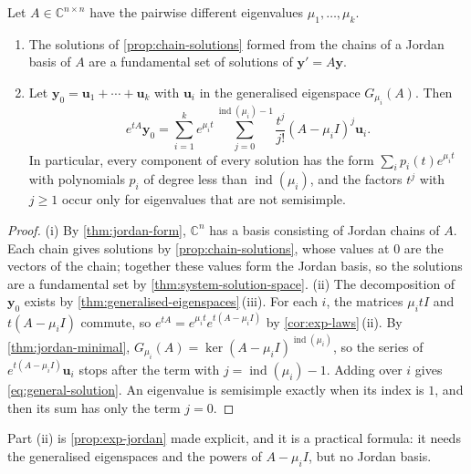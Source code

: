 \begin{theorem}
\label{thm:general-solution-systems}
Let $A\in\mathbb C^{n\times n}$ have the pairwise different eigenvalues $\mu_1,\ldots,\mu_k$.
\begin{enumerate}
\item The solutions of \cref{prop:chain-solutions} formed from the chains of a Jordan basis of $A$ are a fundamental set of solutions of $\mathbf y'=A\mathbf y$.
\item Let $\mathbf y_0=\mathbf u_1+\cdots+\mathbf u_k$ with $\mathbf u_i$ in the generalised eigenspace $G_{\mu_i}(A)$. Then
\begin{equation}
e^{tA}\mathbf y_0=\sum_{i=1}^ke^{\mu_it}\sum_{j=0}^{\operatorname{ind}(\mu_i)-1}\frac{t^j}{j!}(A-\mu_iI)^j\mathbf u_i .
\label{eq:general-solution}
\end{equation}
In particular, every component of every solution has the form $\sum_ip_i(t)e^{\mu_it}$ with polynomials $p_i$ of degree less than $\operatorname{ind}(\mu_i)$, and the factors $t^j$ with $j\ge1$ occur only for eigenvalues that are not semisimple.
\end{enumerate}
\end{theorem}

\begin{proof}
(i) By \cref{thm:jordan-form}, $\mathbb C^n$ has a basis consisting of Jordan chains of $A$. Each chain gives solutions by \cref{prop:chain-solutions}, whose values at $0$ are the vectors of the chain; together these values form the Jordan basis, so the solutions are a fundamental set by \cref{thm:system-solution-space}. (ii) The decomposition of $\mathbf y_0$ exists by \cref{thm:generalised-eigenspaces}\,(iii). For each $i$, the matrices $\mu_itI$ and $t(A-\mu_iI)$ commute, so $e^{tA}=e^{\mu_it}e^{t(A-\mu_iI)}$ by \cref{cor:exp-laws}\,(ii). By \cref{thm:jordan-minimal}, $G_{\mu_i}(A)=\ker(A-\mu_iI)^{\operatorname{ind}(\mu_i)}$, so the series of $e^{t(A-\mu_iI)}\mathbf u_i$ stops after the term with $j=\operatorname{ind}(\mu_i)-1$. Adding over $i$ gives \eqref{eq:general-solution}. An eigenvalue is semisimple exactly when its index is $1$, and then its sum has only the term $j=0$.
\end{proof}

Part (ii) is \cref{prop:exp-jordan} made explicit, and it is a practical formula: it needs the generalised eigenspaces and the powers of $A-\mu_iI$, but no Jordan basis.

